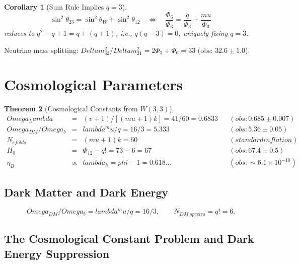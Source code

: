 \documentclass[12pt,a4paper]{article}
\def\mathrm#1{#1}%
\def\textbf#1{#1}%
\def\text#1{#1}%
\def\Delta{Delta}%
\def\lambda{lambda}%
\def\Lambda{Lambda}%
\def\mu{mu}%
\def\phi{phi}%
\def\Phi#1{Phi#1}%
\def\Omega{Omega}%
\newtheorem{theorem}{Theorem}[section]
\newtheorem{corollary}[theorem]{Corollary}
\theoremstyle{definition}
\newcommand{\Phithree}{\Phi_3}
\newcommand{\Phisix}{\Phi_6}
\newcommand{\Phitwelve}{\Phi_{12}}
\begin{document}
\begin{corollary}[Sum Rule Implies $q=3$]
\begin{equation}
\sin^2\theta_{23} = \sin^2\theta_W + \sin^2\theta_{12}
\quad\Longleftrightarrow\quad
\frac{\Phisix}{\Phithree} = \frac{q}{\Phithree}+\frac{\mu}{\Phithree}
\end{equation}
reduces to $q^2-q+1 = q+(q+1)$, i.e., $q(q-3)=0$,
\textbf{uniquely fixing $q=3$}.
\end{corollary}

Neutrino mass splitting:
$\Delta m^2_{32}/\Delta m^2_{21} = 2\Phithree+\Phisix = 33$
\quad(obs: $32.6\pm 1.0$).


\section{Cosmological Parameters}
\label{sec:cosmo}

\begin{theorem}[Cosmological Constants from $W(3,3)$]
\begin{equation}
\renewcommand{\arraystretch}{1.6}
\begin{array}{rclcl}
\Omega_\Lambda &=& (v+1)/[(\mu+1)k] = 41/60 = 0.6833
&&(\text{obs: }0.685\pm 0.007) \\
\Omega_{\mathrm{DM}}/\Omega_b &=& \lambda^\mu/q = 16/3 = 5.333
&&(\text{obs: }5.36\pm 0.05) \\
N_{\text{efolds}} &=& (\mu+1)k = 60
&&(\text{standard inflation}) \\
H_0 &=& \Phitwelve - q! = 73-6 = 67
&&(\text{obs: }67.4\pm 0.5) \\
\eta_B &\propto& \lambda_h = \phi - 1 = 0.618 \dots
&&(\text{obs: }\sim 6.1\times 10^{-10})
\end{array}
\end{equation}
\end{theorem}

\subsection{Dark Matter and Dark Energy}

\begin{equation}
\Omega_{\mathrm{DM}}/\Omega_b = \lambda^\mu/q = 16/3, \qquad
N_{\mathrm{DM\;species}} = q! = 6.
\end{equation}

\subsection{The Cosmological Constant Problem and Dark Energy Suppression}
\end{document}
